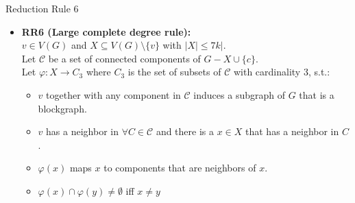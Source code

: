 \documentclass{beamer}
\begin{document}
\begin{frame}{Reduction Rule 6}
    \begin{itemize}[<+->]
        \item \textbf{RR6 (Large complete degree rule):}\\
        \(v\in V(G)\) and \(X\subseteq V(G)\setminus \{v\}\) with \(|X|\leq 7k|\).\\
        Let \(\mathcal C\) be a set of connected components of \(G - X \cup \{c\}\).\\
        Let \(\varphi : X \to C_3\) where \(C_3\) is the set of subsets of \(\mathcal C\) with cardinality 3, s.t.:
        \begin{itemize}
            \item \(v\) together with any component in \(\mathcal C\) induces a subgraph of \(G\) that is a blockgraph.
            \item \(v\) has a neighbor in \(\forall C\in \mathcal C\) and there is a \(x\in X\) that has a neighbor in \(C\).
            \item \(\varphi(x)\) maps \(x\) to components that are neighbors of \(x\). 
            \item \(\varphi(x) \cap \varphi(y) \neq \emptyset\) iff \(x\neq y\)
        \end{itemize}
    \end{itemize}
\end{frame}
\end{document}
